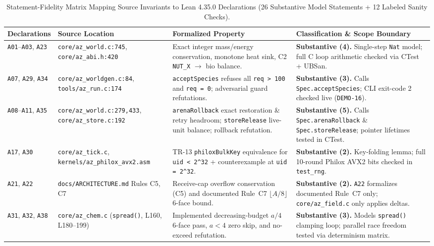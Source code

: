 \documentclass[11pt,reqno]{amsart}
\newcommand{\code}[1]{\texttt{\footnotesize #1}}
\newcommand{\us}{\_\allowbreak}
\newcommand{\slsh}{/\allowbreak}
\begin{document}
\begin{table}[htbp]
\centering
\caption{Statement-Fidelity Matrix Mapping Source Invariants to Lean 4.35.0 Declarations (26 Substantive Model Statements + 12 Labeled Sanity Checks).}
\label{tab:fidelity}
\footnotesize
\setlength{\tabcolsep}{3.5pt}
\begin{tabularx}{\textwidth}{L{2.15cm}L{3.00cm}L{3.95cm}Y}
\toprule
\textbf{Declarations} & \textbf{Source Location} & \textbf{Formalized Property} & \textbf{Classification \& Scope Boundary} \\
\midrule
\code{A01}--\code{A03}, \code{A23} & \code{core\slsh az\us world.c:745}, \code{core\slsh az\us abi.h:420} & Exact integer mass/energy conservation, monotone heat sink, C2 \code{NUT\us X} $\to$ bio balance. & \textbf{Substantive (4).} Single-step \code{Nat} model; full C loop arithmetic checked via CTest + UBSan. \\
\code{A07}, \code{A29}, \code{A34} & \code{core\slsh az\us worldgen.c:84}, \code{tools\slsh az\us run.c:174} & \code{acceptSpecies} refuses all \code{req > 100} and \code{req = 0}; adversarial guard refutations. & \textbf{Substantive (3).} Calls \code{Spec.acceptSpecies}; CLI exit-code 2 checked live (\code{DEMO-16}). \\
\code{A08}--\code{A11}, \code{A35} & \code{core\slsh az\us world.c:279,433}, \code{core\slsh az\us store.c:192} & \code{arenaRollback} exact restoration \& retry headroom; \code{storeRelease} live-unit balance; rollback refutation. & \textbf{Substantive (5).} Calls \code{Spec.arenaRollback} \& \code{Spec.storeRelease}; pointer lifetimes tested in CTest. \\
\code{A17}, \code{A30} & \code{core\slsh az\us tick.c}, \code{kernels\slsh az\us philox\us avx2.asm} & TR-13 \code{philoxBulkKey} equivalence for \code{uid < 2\^{}32} + counterexample at \code{uid = 2\^{}32}. & \textbf{Substantive (2).} Key-folding lemma; full 10-round Philox AVX2 bits checked in \code{test\us rng}. \\
\code{A21}, \code{A22} & \code{docs\slsh ARCHITECTURE.md} Rules C5, C7 & Receive-cap overflow conservation (C5) and documented Rule~C7 $\lfloor A/8 \rfloor$ 6-face bound. & \textbf{Substantive (2).} \code{A22} formalizes documented Rule~C7 only; \code{core\slsh az\us field.c} only applies deltas. \\
\code{A31}, \code{A32}, \code{A38} & \code{core\slsh az\us chem.c} (\code{spread()}, L160, L180--199) & Implemented decreasing-budget $a/4$ 6-face pass, $a<4$ zero skip, and no-exceed refutation. & \textbf{Substantive (3).} Models \code{spread()} clamping loop; parallel race freedom tested via determinism matrix. \\

\end{tabularx}
\end{table}
\end{document}
